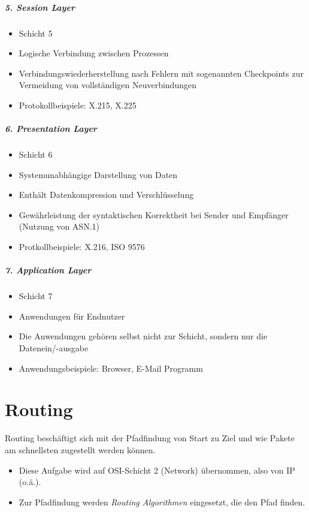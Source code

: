 	\paragraph{5. Session Layer}
		\begin{itemize}
			\item Schicht 5
			\item Logische Verbindung zwischen Prozessen
			\item Verbindungswiederherstellung nach Fehlern mit sogenannten Checkpoints zur Vermeidung von vollständigen Neuverbindungen
			\item Protokollbeispiele: X.215, X.225
		\end{itemize}

	\paragraph{6. Presentation Layer}
		\begin{itemize}
			\item Schicht 6
			\item Systemunabhängige Darstellung von Daten
			\item Enthält Datenkompression und Verschlüsselung
			\item Gewährleistung der syntaktischen Korrektheit bei Sender und Empfänger (Nutzung von ASN.1)
			\item Protkollbeispiele: X.216, ISO 9576
		\end{itemize}

	\paragraph{7. Application Layer}
		\begin{itemize}
			\item Schicht 7
			\item Anwendungen für Endnutzer
			\item Die Anwendungen gehören selbst nicht zur Schicht, sondern nur die Datenein/-ausgabe
			\item Anwendungsbeispiele: Browser, E-Mail Programm
		\end{itemize}

\chapter{Routing}
	Routing beschäftigt sich mit der Pfadfindung von Start zu Ziel und wie Pakete am schnellsten zugestellt werden können.
	\begin{itemize}
		\item Diese Aufgabe wird auf OSI-Schicht 2 (Network) übernommen, also von IP (o.ä.).
		\item Zur Pfadfindung werden \textit{Routing Algorithmen} eingesetzt, die den Pfad finden.
	\end{itemize}

